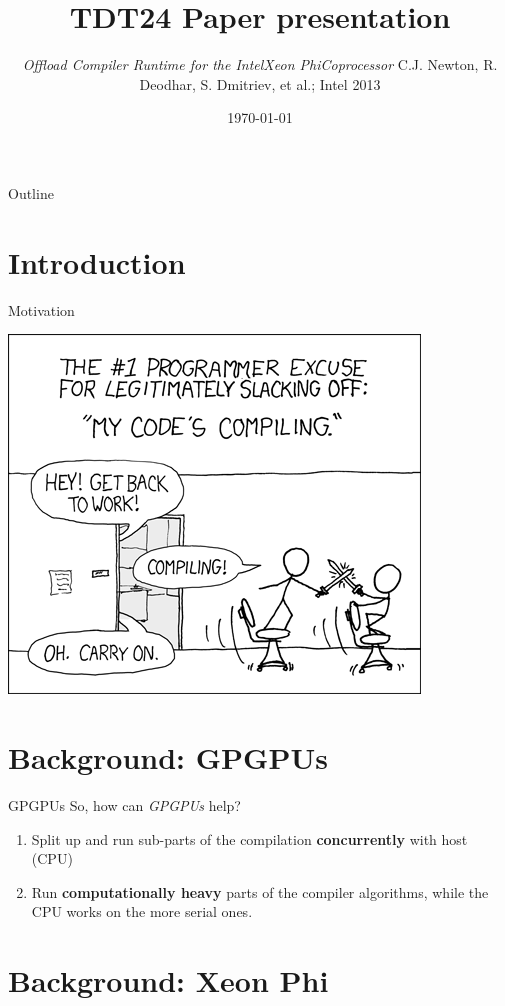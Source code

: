\documentclass[screen]{beamer}
\title[Compiler Offloading]{TDT24 Paper presentation}
\subtitle{\textit{Offload Compiler Runtime for the Intel\textregistered Xeon Phi\texttrademark Coprocessor}
\newline C.J. Newton, R. Deodhar, S. Dmitriev, et al.; Intel 2013}
\institute[IDI - NTNU]{Institutt for Datateknikk og Informasjonsvitenskap}
\date[November 2014]{\today} %
\begin{document}

\nocite{DBLP:conf/ipps/NewburnDNWMCDM13, xkcd:compiling}

\ntnutitlepage

\begin{frame}{Outline}
    \tableofcontents
\end{frame}

\section{Introduction}

\begin{frame}{Motivation}
    \pause
    \begin{center}
        \includegraphics[width=0.5\linewidth]{compiling.png}
    \end{center}
\end{frame}

\section{Background: GPGPUs}

\begin{frame}{GPGPUs}
    So, how can \textit{GPGPUs} help?
    \begin{enumerate}[<+-| alert@+>]
        \item Split up and run sub-parts of the compilation \textbf{concurrently} with host (CPU)
        \item Run \textbf{computationally heavy} parts of the compiler algorithms, while the CPU works on the more serial ones.
    \end{enumerate}
\end{frame}

\section{Background: Xeon Phi}
\end{document}

